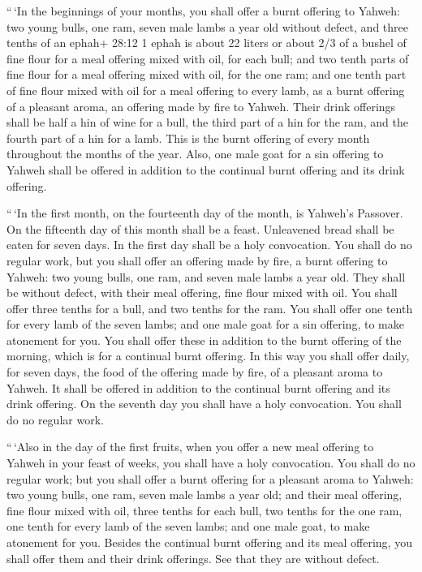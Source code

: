  ``\,`In the beginnings of your months, you shall offer a
burnt offering to Yahweh: two young bulls, one ram, seven male lambs a
year old without defect,  and three tenths of an ephah+
28:12 1 ephah is about 22 liters or about 2/3 of a bushel of fine flour
for a meal offering mixed with oil, for each bull; and two tenth parts
of fine flour for a meal offering mixed with oil, for the one ram;
 and one tenth part of fine flour mixed with oil for a meal
offering to every lamb, as a burnt offering of a pleasant aroma, an
offering made by fire to Yahweh.  Their drink offerings
shall be half a hin of wine for a bull, the third part of a hin for the
ram, and the fourth part of a hin for a lamb. This is the burnt offering
of every month throughout the months of the year.  Also,
one male goat for a sin offering to Yahweh shall be offered in addition
to the continual burnt offering and its drink offering.

 ``\,`In the first month, on the fourteenth day of the
month, is Yahweh's Passover.  On the fifteenth day of this
month shall be a feast. Unleavened bread shall be eaten for seven days.
 In the first day shall be a holy convocation. You shall do
no regular work,  but you shall offer an offering made by
fire, a burnt offering to Yahweh: two young bulls, one ram, and seven
male lambs a year old. They shall be without defect,  with
their meal offering, fine flour mixed with oil. You shall offer three
tenths for a bull, and two tenths for the ram.  You shall
offer one tenth for every lamb of the seven lambs;  and one
male goat for a sin offering, to make atonement for you. 
You shall offer these in addition to the burnt offering of the morning,
which is for a continual burnt offering.  In this way you
shall offer daily, for seven days, the food of the offering made by
fire, of a pleasant aroma to Yahweh. It shall be offered in addition to
the continual burnt offering and its drink offering.  On
the seventh day you shall have a holy convocation. You shall do no
regular work.

 ``\,`Also in the day of the first fruits, when you offer a
new meal offering to Yahweh in your feast of weeks, you shall have a
holy convocation. You shall do no regular work;  but you
shall offer a burnt offering for a pleasant aroma to Yahweh: two young
bulls, one ram, seven male lambs a year old;  and their
meal offering, fine flour mixed with oil, three tenths for each bull,
two tenths for the one ram,  one tenth for every lamb of
the seven lambs;  and one male goat, to make atonement for
you.  Besides the continual burnt offering and its meal
offering, you shall offer them and their drink offerings. See that they
are without defect.

